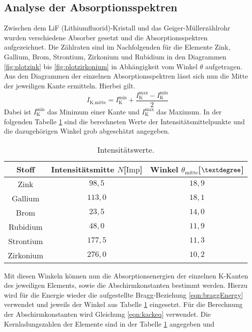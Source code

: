 \subsection{Analyse der Absorptionsspektren}
Zwischen dem LiF (Lithiumfluorid)-Kristall und das Geiger-Müllerzählrohr wurden verschiedene Absorber gesetzt und die Absorptionsspektren aufgezeichnet.
Die Zählraten sind im Nachfolgenden für die Elemente Zink, Gallium, Brom, Strontium, Zirkonium und Rubidium in den Diagrammen \ref{fig:plotzink} bis \ref{fig:plotzirkonium} in Abhängigkeit vom 
Winkel $\theta$ aufgetragen.
Aus den Diagrammen der einzelnen Absorptionsspektren lässt sich nun die Mitte der jeweiligen Kante ermitteln.
Hierbei gilt.
\begin{equation}
I_{\text{K,mitte}} = I_{\text{K}}^{\text{min}} + \frac{I_{\text{K}}^{\text{max}} - I_{\text{K}}^{\text{min}}}{2}
\end{equation}
Dabei ist $I_{\text{K}}^{\text{min}}$ das Minimum einer Kante und $I_{\text{K}}^{\text{max}}$ das Maximum.
In der folgenden Tabelle \ref{tab:whatever} sind die berechneten Werte der Intensitätsmittelpunkte und die dazugehörigen Winkel grob abgeschätzt angegeben.
\begin{table}
\centering
\caption{Intensitätswerte.}
\label{tab:whatever}
\begin{tabular}{c c c}
    \toprule
    Stoff & Intensitätsmitte $N$[$\text{Imp}$] & Winkel $\theta_{\text{mitte}}$[$\textdegree$]\\
    \midrule
    Zink       &  $98{,5}$ & $18{,}9$ \\
    Gallium    &  $113{,}0$ & $18{,}1$ \\
    Brom          & $23{,}5$ & $14{,}0$ \\
     Rubidium     & $48{,}0$ & $11{,}9$ \\
      Strontium   & $177{,}5$ & $11{,}3$ \\
       Zirkonium  & $276{,}0$ & $10{,}2$ \\
    \bottomrule
\end{tabular}
\end{table}
Mit diesen Winkeln können nun die Absorptionsenergien der einzelnen K-Kanten des jeweiligen Elements, sowie die Abschirmkonstanten bestimmt werden.
Hierzu wird für die Energie wieder die aufgestellte Bragg-Beziehung \eqref{eqn:braggEnergy} verwendet und jeweils der Winkel aus Tabelle \ref{tab:whatever}
eingesetzt. Für die Berechnung der Abschirmkonstanten wird Gleichung \eqref{eqn:kackeq} verwendet. Die Kernladungszahlen der Elemente sind in der Tabelle \ref{tab:whatever} angegeben und
